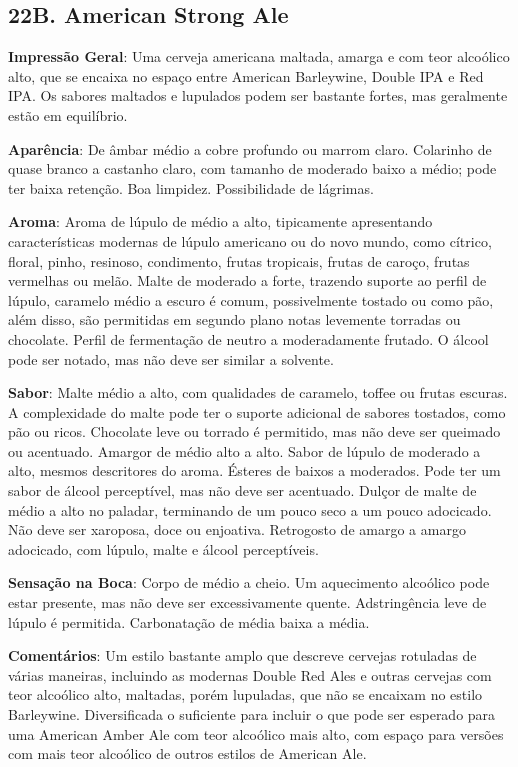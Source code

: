 \subsection*{22B. American Strong Ale}

\textbf{Impressão Geral}: Uma cerveja americana maltada, amarga e com teor alcoólico alto, que se encaixa no espaço entre American Barleywine, Double IPA e Red IPA. Os sabores maltados e lupulados podem ser bastante fortes, mas geralmente estão em equilíbrio.

\textbf{Aparência}: De âmbar médio a cobre profundo ou marrom claro. Colarinho de quase branco a castanho claro, com tamanho de moderado baixo a médio; pode ter baixa retenção. Boa limpidez. Possibilidade de lágrimas.

\textbf{Aroma}: Aroma de lúpulo de médio a alto, tipicamente apresentando características modernas de lúpulo americano ou do novo mundo, como cítrico, floral, pinho, resinoso, condimento, frutas tropicais, frutas de caroço, frutas vermelhas ou melão. Malte de moderado a forte, trazendo suporte ao perfil de lúpulo, caramelo médio a escuro é comum, possivelmente tostado ou como pão, além disso, são permitidas em segundo plano notas levemente torradas ou chocolate. Perfil de fermentação de neutro a moderadamente frutado. O álcool pode ser notado, mas não deve ser similar a solvente.

\textbf{Sabor}: Malte médio a alto, com qualidades de caramelo, toffee ou frutas escuras. A complexidade do malte pode ter o suporte adicional de sabores tostados, como pão ou ricos. Chocolate leve ou torrado é permitido, mas não deve ser queimado ou acentuado. Amargor de médio alto a alto. Sabor de lúpulo de moderado a alto, mesmos descritores do aroma. Ésteres de baixos a moderados. Pode ter um sabor de álcool perceptível, mas não deve ser acentuado. Dulçor de malte de médio a alto no paladar, terminando de um pouco seco a um pouco adocicado. Não deve ser xaroposa, doce ou enjoativa. Retrogosto de amargo a amargo adocicado, com lúpulo, malte e álcool perceptíveis.

\textbf{Sensação na Boca}: Corpo de médio a cheio. Um aquecimento alcoólico pode estar presente, mas não deve ser excessivamente quente. Adstringência leve de lúpulo é permitida. Carbonatação de média baixa a média.

\textbf{Comentários}: Um estilo bastante amplo que descreve cervejas rotuladas de várias maneiras, incluindo as modernas Double Red Ales e outras cervejas com teor alcoólico alto, maltadas, porém lupuladas, que não se encaixam no estilo Barleywine. Diversificada o suficiente para incluir o que pode ser esperado para uma American Amber Ale com teor alcoólico mais alto, com espaço para versões com mais teor alcoólico de outros estilos de American Ale.

